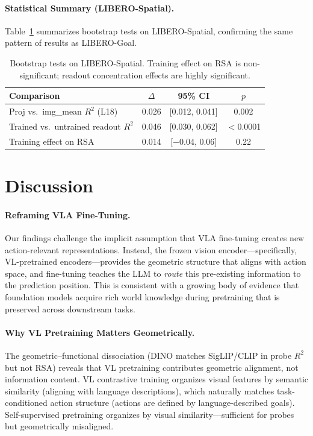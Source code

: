 \documentclass[letterpaper]{article}
\begin{document}
\paragraph{Statistical Summary (LIBERO-Spatial).}
Table~\ref{tab:spatial-bootstrap} summarizes bootstrap tests on LIBERO-Spatial, confirming the same pattern of results as LIBERO-Goal.

\begin{table}[t]
\centering
\caption{Bootstrap tests on LIBERO-Spatial. Training effect on RSA is non-significant; readout concentration effects are highly significant.}
\label{tab:spatial-bootstrap}
\begin{tabular}{@{}lccc@{}}
\toprule
Comparison & $\Delta$ & 95\% CI & $p$ \\
\midrule
Proj vs.\ img\_mean $R^2$ (L18) & 0.026 & {[0.012, 0.041]} & 0.002 \\
Trained vs.\ untrained readout $R^2$ & 0.046 & {[0.030, 0.062]} & $<$0.0001 \\
Training effect on RSA & 0.014 & {[$-$0.04, 0.06]} & 0.22 \\
\bottomrule
\end{tabular}
\end{table}

\section{Discussion}
\label{sec:discussion}

\paragraph{Reframing VLA Fine-Tuning.}
Our findings challenge the implicit assumption that VLA fine-tuning creates new action-relevant representations.
Instead, the frozen vision encoder---specifically, VL-pretrained encoders---provides the geometric structure that aligns with action space, and fine-tuning teaches the LLM to \emph{route} this pre-existing information to the prediction position.
This is consistent with a growing body of evidence that foundation models acquire rich world knowledge during pretraining that is preserved across downstream tasks.

\paragraph{Why VL Pretraining Matters Geometrically.}
The geometric--functional dissociation (DINO matches SigLIP/CLIP in probe $R^2$ but not RSA) reveals that VL pretraining contributes geometric alignment, not information content.
VL contrastive training organizes visual features by semantic similarity (aligning with language descriptions), which naturally matches task-conditioned action structure (actions are defined by language-described goals).
Self-supervised pretraining organizes by visual similarity---sufficient for probes but geometrically misaligned.
\end{document}
